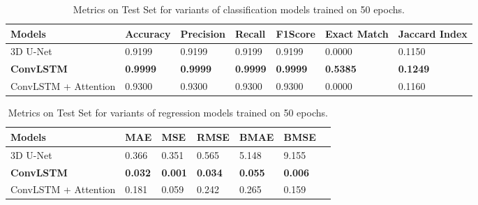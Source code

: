 \begin{table*}[h]
  \caption[short]{Metrics on Test Set for variants of classification models trained on 50 epochs.}
  \begin{tabular}{@{}lllllll@{}}
  \toprule
  Models               & Accuracy & Precision & Recall & F1Score & Exact Match & Jaccard Index \\ \midrule
  3D U-Net             & 0.9199   & 0.9199    & 0.9199 & 0.9199  & 0.0000      & 0.1150        \\
  \textbf{ConvLSTM}    & \textbf{0.9999}   &  \textbf{0.9999}    & \textbf{0.9999} & \textbf{0.9999}  & \textbf{0.5385}      & \textbf{0.1249}        \\
  ConvLSTM + Attention & 0.9300   & 0.9300    & 0.9300 & 0.9300  & 0.0000      & 0.1160 
  \end{tabular}
  \label{tab:class}
\end{table*}

\begin{table*}[h]
  \caption[short]{Metrics on Test Set for variants of regression models trained on 50 epochs.}
  \begin{tabular}{@{}lllllll@{}}
  \toprule
  Models                & MAE & MSE & RMSE & BMAE & BMSE \\ \midrule
  3D U-Net              & 0.366  & 	0.351  & 0.565 & 	5.148  & 9.155 \\
    \textbf{ConvLSTM}   & \textbf{0.032}   &  \textbf{0.001} & \textbf{0.034} & \textbf{0.055}  & \textbf{0.006}  \\
  ConvLSTM + Attention  & 0.181   & 0.059 & 0.242 & 0.265  & 0.159  \\
  \end{tabular}
  \label{tab:reg}
\end{table*}